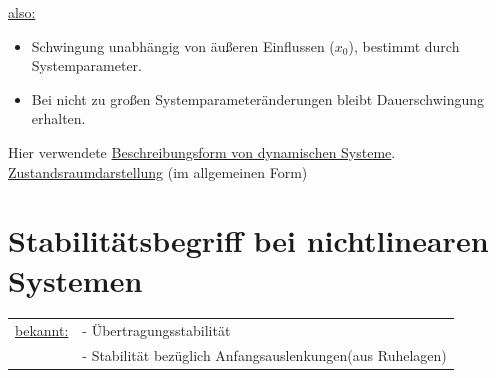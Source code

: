 \documentclass[openany,a4paper,11pt]{book}
\begin{document}
\uline{also:} 
\begin{itemize}
    \item Schwingung unabhängig von äußeren Einflussen ($x_0$), bestimmt durch Systemparameter.
    \item Bei nicht zu großen Systemparameteränderungen bleibt Dauerschwingung erhalten. 
\end{itemize}
Hier verwendete \uline{Beschreibungsform von dynamischen Systeme}.\\
\uline{Zustandsraumdarstellung} (im allgemeinen Form) 
\section[Grundlagen]{Stabilitätsbegriff bei nichtlinearen Systemen}
\begin{tabular}{ll}
\uline{bekannt:} & - Übertragungsstabilität\\
& - Stabilität bezüglich Anfangsauslenkungen(aus Ruhelagen)\\
\end{tabular}
\end{document}
